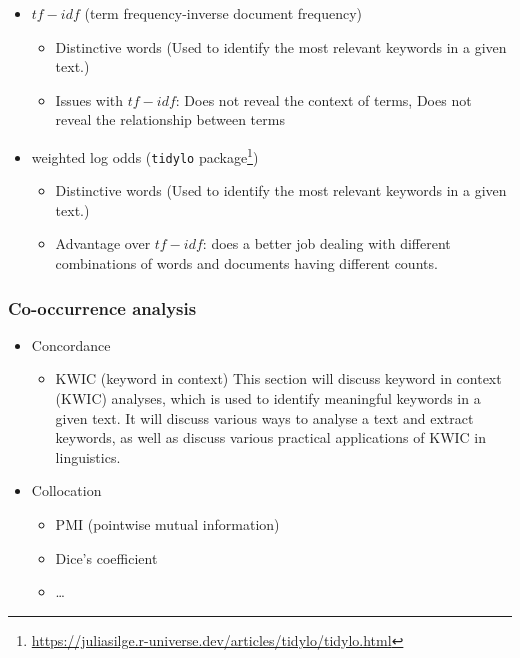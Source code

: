 \documentclass[
  letterpaper,
]{latex/krantz}
\providecommand{\tightlist}{%
  \setlength{\itemsep}{0pt}\setlength{\parskip}{0pt}}\usepackage{longtable,booktabs,array}
\DeclareRobustCommand{\href}[2]{#2\footnote{\url{#1}}}
\begin{document}
\begin{itemize}
\begin{itemize}
    \begin{itemize}
    \tightlist
    \item
      \(tf-idf\) (term frequency-inverse document frequency)

      \begin{itemize}
      \tightlist
      \item
        Distinctive words (Used to identify the most relevant keywords
        in a given text.)
      \item
        Issues with \(tf-idf\): Does not reveal the context of terms,
        Does not reveal the relationship between terms
      \end{itemize}
    \item
      weighted log odds
      (\href{https://juliasilge.r-universe.dev/articles/tidylo/tidylo.html}{\texttt{tidylo}
      package})

      \begin{itemize}
      \tightlist
      \item
        Distinctive words (Used to identify the most relevant keywords
        in a given text.)
      \item
        Advantage over \(tf-idf\): does a better job dealing with
        different combinations of words and documents having different
        counts.
      \end{itemize}
    \end{itemize}
  \end{itemize}
\end{itemize}

\hypertarget{eda-co-occurrence}{%
\subsubsection{Co-occurrence analysis}\label{eda-co-occurrence}}

\begin{itemize}
\tightlist
\item
  Concordance

  \begin{itemize}
  \tightlist
  \item
    KWIC (keyword in context) This section will discuss keyword in
    context (KWIC) analyses, which is used to identify meaningful
    keywords in a given text. It will discuss various ways to analyse a
    text and extract keywords, as well as discuss various practical
    applications of KWIC in linguistics.
  \end{itemize}
\item
  Collocation

  \begin{itemize}
  \tightlist
  \item
    PMI (pointwise mutual information)
  \item
    Dice's coefficient
  \item
    \ldots{}
  \end{itemize}
\end{itemize}
\end{document}
